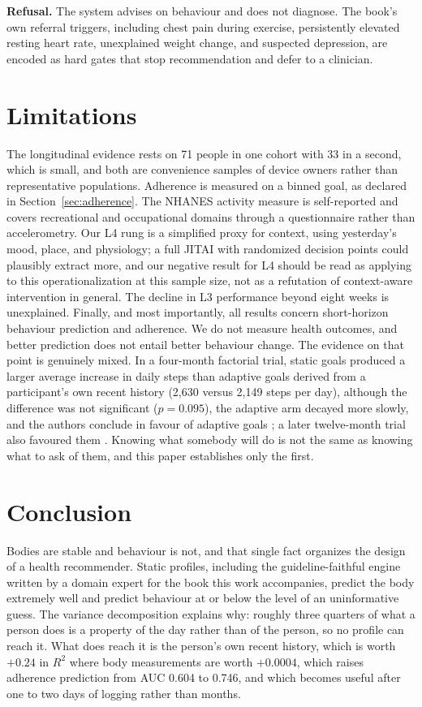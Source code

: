 \documentclass[conference]{IEEEtran}
\begin{document}
\textbf{Refusal.} The system advises on behaviour and does not diagnose. The book's own referral triggers, including chest pain during exercise, persistently elevated resting heart rate, unexplained weight change, and suspected depression, are encoded as hard gates that stop recommendation and defer to a clinician.

\section{Limitations}

The longitudinal evidence rests on 71 people in one cohort with 33 in a second, which is small, and both are convenience samples of device owners rather than representative populations. Adherence is measured on a binned goal, as declared in Section~\ref{sec:adherence}. The NHANES activity measure is self-reported and covers recreational and occupational domains through a questionnaire rather than accelerometry. Our L4 rung is a simplified proxy for context, using yesterday's mood, place, and physiology; a full JITAI with randomized decision points could plausibly extract more, and our negative result for L4 should be read as applying to this operationalization at this sample size, not as a refutation of context-aware intervention in general. The decline in L3 performance beyond eight weeks is unexplained. Finally, and most importantly, all results concern short-horizon behaviour prediction and adherence. We do not measure health outcomes, and better prediction does not entail better behaviour change. The evidence on that point is genuinely mixed. In a four-month factorial trial, static goals produced a larger average increase in daily steps than adaptive goals derived from a participant's own recent history (2{,}630 versus 2{,}149 steps per day), although the difference was not significant ($p = 0.095$), the adaptive arm decayed more slowly, and the authors conclude in favour of adaptive goals \cite{adams2017goals}; a later twelve-month trial also favoured them \cite{adams2022reinforcement}. Knowing what somebody will do is not the same as knowing what to ask of them, and this paper establishes only the first.

\section{Conclusion}

Bodies are stable and behaviour is not, and that single fact organizes the design of a health recommender. Static profiles, including the guideline-faithful engine written by a domain expert for the book this work accompanies, predict the body extremely well and predict behaviour at or below the level of an uninformative guess. The variance decomposition explains why: roughly three quarters of what a person does is a property of the day rather than of the person, so no profile can reach it. What does reach it is the person's own recent history, which is worth $+0.24$ in $R^2$ where body measurements are worth $+0.0004$, which raises adherence prediction from AUC 0.604 to 0.746, and which becomes useful after one to two days of logging rather than months.
\end{document}

